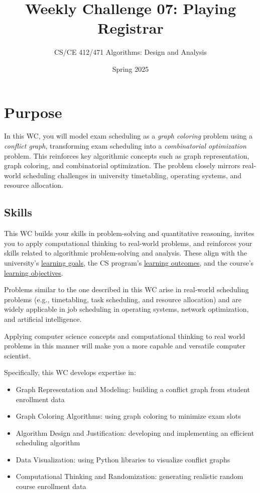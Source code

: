 \documentclass[a4paper]{exam}
\title{Weekly Challenge 07: Playing Registrar}
\author{CS/CE 412/471 Algorithms: Design and Analysis}
\date{Spring 2025}
\begin{document}
\maketitle
\thispagestyle{empty}

\section*{Purpose}

In this WC, you will model exam scheduling as a \textit{graph coloring} problem using a \textit{conflict graph}, transforming exam scheduling into a \textit{combinatorial optimization} problem. This reinforces key algorithmic concepts such as graph representation, graph coloring, and combinatorial optimization. The problem closely mirrors real-world scheduling challenges in university timetabling, operating systems, and resource allocation.

\subsection*{Skills}

This WC builds your skills in problem-solving and quantitative reasoning, invites you to apply computational thinking to real-world problems, and reinforces your skills related to algorithmic problem-solving and analysis. These align with the university's  \href{https://habib.edu.pk/about-us/vision-values/}{learning goals}, the CS program's \href{https://habib.edu.pk/academics/sse/computer-science/}{learning outcomes}, and the course's \href{https://hulms.instructure.com/courses/4297/outcomes}{learning objectives}.

Problems similar to the one described in this WC arise in real-world scheduling problems (e.g., timetabling, task scheduling, and resource allocation) and are widely applicable in job scheduling in operating systems, network optimization, and artificial intelligence.

Applying computer science concepts and computational thinking to real world problems in this manner will make you a more capable and versatile computer scientist.

Specifically, this WC develops expertise in:
\begin{itemize}
\item Graph Representation and Modeling: building a conflict graph from student enrollment data
\item Graph Coloring Algorithms: using graph coloring to minimize exam slots
\item Algorithm Design and Justification: developing and implementing an efficient scheduling algorithm
\item Data Visualization: using Python libraries to visualize conflict graphs
\item Computational Thinking and Randomization: generating realistic random course enrollment data
\end{itemize}
\end{document}
